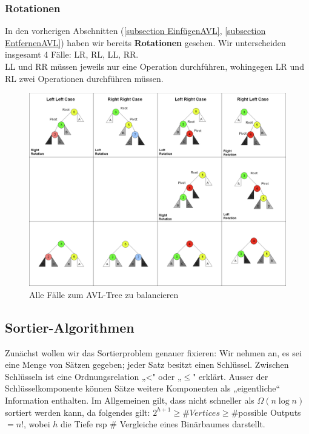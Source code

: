 \documentclass[a4paper]{article}
\begin{document}
\subsubsection{Rotationen} \label{Rotationsabschnitt}
In den vorherigen Abschnitten (\ref{subsection EinfügenAVL}, \ref{subsection EntfernenAVL}) haben wir bereits \textbf{Rotationen} gesehen. Wir unterscheiden insgesamt 4 Fälle: LR, RL, LL, RR. \\
LL und RR müssen jeweils nur eine Operation durchführen, wohingegen LR und RL zwei Operationen durchführen müssen. 

\begin{figure}[h]
    \centering
    \includegraphics[width = \textwidth]{Pictures/AVL-Rotations.png}
    \caption{Alle Fälle zum AVL-Tree zu balancieren}
    \label{fig:AVL-rotations}
\end{figure}


\newpage
\subsection{Sortier-Algorithmen}
Zunächst wollen wir das Sortierproblem genauer fixieren: Wir nehmen an, es sei eine
Menge von Sätzen gegeben; jeder Satz besitzt einen Schlüssel. Zwischen Schlüsseln ist
eine Ordnungsrelation „<" oder „$\leq$" erklärt. Ausser der Schlüsselkomponente können
Sätze weitere Komponenten als „eigentliche“ Information enthalten. Im Allgemeinen gilt, dass nicht schneller als $\Omega(n\log n)$ sortiert werden kann, da folgendes gilt: $2^{h+1} \geq \#Vertices \geq \#$possible Outputs $= n!$, wobei $h$ die Tiefe rsp \# Vergleiche eines Binärbaumes darstellt.
\end{document}
